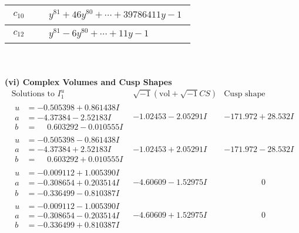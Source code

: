 \documentclass[1p]{elsarticle_modified}
\theoremstyle{definition}
\newcommand{\I}{\sqrt{-1}}
\begin{document}
\begin{tabular}{m{50pt}|m{274pt}}
\hline $$\begin{aligned}c_{10}\end{aligned}$$&$\begin{aligned}
&y^{81}+46 y^{80}+\cdots+39786411 y-1
\end{aligned}$\\
\hline $$\begin{aligned}c_{12}\end{aligned}$$&$\begin{aligned}
&y^{81}-6 y^{80}+\cdots+11 y-1
\end{aligned}$\\
\hline
\end{tabular}\\~\\
\newpage\flushleft \textbf{(vi) Complex Volumes and Cusp Shapes}
$$\begin{array}{c|c|c}  
\text{Solutions to }I^u_{1}& \I (\text{vol} + \sqrt{-1}CS) & \text{Cusp shape}\\
 \hline 
\begin{aligned}
u &= -0.505398 + 0.861438 I \\
a &= -4.37384 - 2.52183 I \\
b &= \phantom{-}0.603292 - 0.010555 I\end{aligned}
 & -1.02453 - 2.05291 I & -171.972 + 28.532 I \\ \hline\begin{aligned}
u &= -0.505398 - 0.861438 I \\
a &= -4.37384 + 2.52183 I \\
b &= \phantom{-}0.603292 + 0.010555 I\end{aligned}
 & -1.02453 + 2.05291 I & -171.972 - 28.532 I \\ \hline\begin{aligned}
u &= -0.009112 + 1.005390 I \\
a &= -0.308654 + 0.203514 I \\
b &= -0.336499 - 0.810387 I\end{aligned}
 & -4.60609 - 1.52975 I & \phantom{-0.000000 } 0 \\ \hline\begin{aligned}
u &= -0.009112 - 1.005390 I \\
a &= -0.308654 - 0.203514 I \\
b &= -0.336499 + 0.810387 I\end{aligned}
 & -4.60609 + 1.52975 I & \phantom{-0.000000 } 0 \\ \hline\begin{aligned}

\end{aligned}
\end{array}$$
\end{document}

